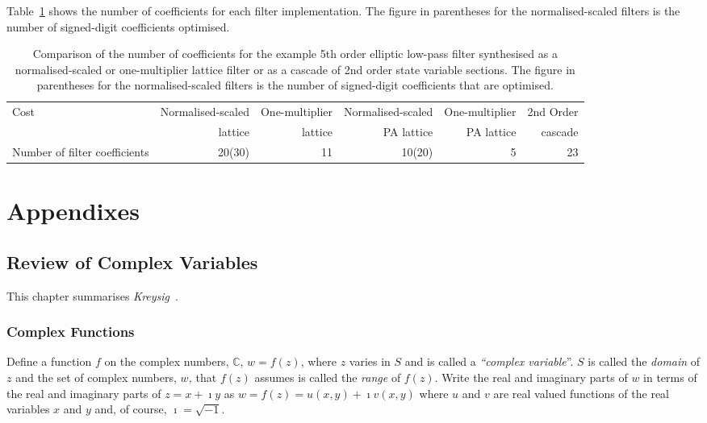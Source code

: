 \documentclass[a4paper,twoside,10pt,english]{report}
\begin{document}
Table~\ref{tab:filter-implementation-number-coef-summary} shows the number of
coefficients for each filter implementation. The figure in parentheses for the
normalised-scaled filters is the number of signed-digit coefficients optimised.
\begin{table}[!hb]
\centering
\begin{threeparttable}
\begin{tabular}{lrrrrr} \toprule
Cost&Normalised-scaled&One-multiplier&Normalised-scaled&One-multiplier&2nd Order\\
&lattice&lattice&PA lattice&PA lattice& cascade\\
\midrule
Number of filter coefficients    & 20(30) & 11 & 10(20) & 5 & 23 \\ 
\bottomrule
\end{tabular}
\end{threeparttable}
\caption[Comparison of number of coefficients for each filter implementation]
{Comparison of the number of coefficients for the example 5th order
elliptic low-pass filter synthesised as a normalised-scaled or one-multiplier 
lattice filter or as a cascade of 2nd order state variable sections. The
figure in parentheses for the normalised-scaled filters is the number of 
signed-digit coefficients that are optimised.}
\label{tab:filter-implementation-number-coef-summary}
\end{table}
\cleardoublepage
\appendix
\part{Appendixes}
\cleardoublepage
\chapter{\label{app:Review-of-complex-variables}Review of Complex Variables} 
This chapter summarises 
\emph{Kreysig}~\cite[Chapter 12(Sections 4 and 5), Chapter 14]{KreyzigAdvancedEngineeringMathematics}.
\section{Complex Functions}
Define a function \emph{$f$} on the complex numbers, $\mathbb{C}$,
$w=f\left(z\right)$, where \emph{$z$} varies in \emph{$S$} and is called a
\emph{``complex variable}''. \emph{$S$} is called the \emph{domain}
of \emph{$z$} and the set of complex numbers, \emph{$w$, }that\emph{
$f\left(z\right)$ }assumes is called the \emph{range }of $f\left(z\right)$. Write the
real and imaginary parts of \emph{$w$} in terms of the real and imaginary
parts of $z=x+\imath y$ as $w=f\left(z\right)=u(x,y)+\imath v(x,y)$ where \emph{$u$}
and \emph{$v$} are real valued functions of the real variables \emph{$x$}
and $y$ and, of course, $\imath=\sqrt{-1}$.
\end{document}
